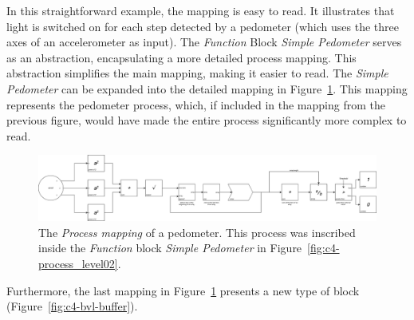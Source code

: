 In this straightforward example, the mapping is easy to read. It illustrates that light is switched on for each step detected by a pedometer (which uses the three axes of an accelerometer as input). The \textit{Function} Block \textit{Simple Pedometer} serves as an abstraction, encapsulating a more detailed process mapping. This abstraction simplifies the main mapping, making it easier to read. The \textit{Simple Pedometer} can be expanded into the detailed mapping in Figure~\ref{fig:c4-process_level03}. This mapping represents the pedometer process, which, if included in the mapping from the previous figure, would have made the entire process significantly more complex to read.

\begin{figure}[!h]
    \centering
    \includegraphics[width=\linewidth]{chapters/4-MDC_model_application/image/bvl-process_level03.png}
    \caption{The \textit{Process mapping} of a pedometer. This process was inscribed inside the \textit{Function} block \textit{Simple Pedometer} in Figure~\ref{fig:c4-process_level02}.}
    \label{fig:c4-process_level03}
\end{figure}

Furthermore, the last mapping in Figure~\ref{fig:c4-process_level03} presents a new type of block (Figure~\ref{fig:c4-bvl-buffer}). 

